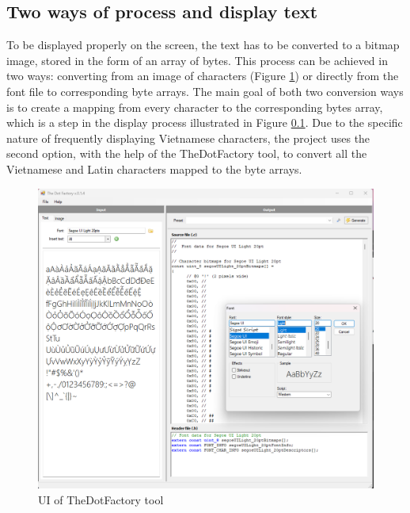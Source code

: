 \documentclass[../Main.tex]{subfiles}
\begin{document}
\subsection{Two ways of process and display text}
\label{2-ways-process}
To be displayed properly on the screen, the text has to be converted to a bitmap image, stored in the form of an array of bytes. This process can be achieved in two ways: converting from an image of characters (Figure \ref{fig:thedotfactory}) or directly from the font file to corresponding byte arrays. The main goal of both two conversion ways is to create a mapping from every character to the corresponding bytes array, which is a step in the display process illustrated in Figure \ref{2-ways-process}. Due to the specific nature of frequently displaying Vietnamese characters, the project uses the second option, with the help of the TheDotFactory tool, to convert all the Vietnamese and Latin characters mapped to the byte arrays.
\begin{figure}[h]
    \centering
    \includegraphics[width=0.8\linewidth]{doc/imgs/thedotfactory.png}
    \caption{UI of TheDotFactory tool}
    \label{fig:thedotfactory}
\end{figure}
\end{document}
